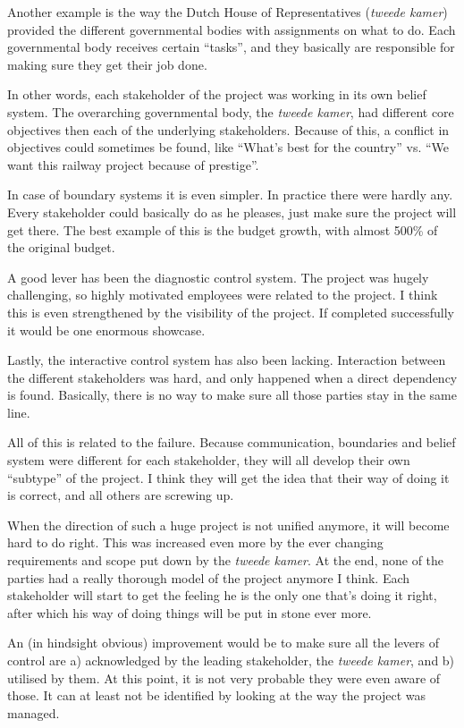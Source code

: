 \documentclass[]{uva-bachelor-thesis}
\begin{document}
Another example is the way the Dutch House of Representatives (\emph{tweede kamer}) provided the different governmental bodies with assignments on what to do. 
Each governmental body receives certain ``tasks'', and they basically are responsible for making sure they get their job done.

In other words, each stakeholder of the project was working in its own belief system.
The overarching governmental body, the \emph{tweede kamer}, had different core objectives then each of the underlying stakeholders. 
Because of this, a conflict in objectives could sometimes be found, like ``What's best for the country'' vs. ``We want this railway project because of prestige''.

In case of boundary systems it is even simpler. 
In practice there were hardly any. 
Every stakeholder could basically do as he pleases, just make sure the project will get there. 
The best example of this is the budget growth, with almost 500\% of the original budget.

A good lever has been the diagnostic control system. 
The project was hugely challenging, so highly motivated employees were related to the project. 
I think this is even strengthened by the visibility of the project. 
If completed successfully it would be one enormous showcase.

Lastly, the interactive control system has also been lacking. 
Interaction between the different stakeholders was hard, and only happened when a direct dependency is found. 
Basically, there is no way to make sure all those parties stay in the same line. 

All of this is related to the failure. 
Because communication, boundaries and belief system were different for each stakeholder, they will all develop their own ``subtype'' of the project. 
I think they will get the idea that their way of doing it is correct, and all others are screwing up. 

When the direction of such a huge project is not unified anymore, it will become hard to do right. 
This was increased even more by the ever changing requirements and scope put down by the \emph{tweede kamer}. 
At the end, none of the parties had a really thorough model of the project anymore I think.
Each stakeholder will start to get the feeling he is the only one that's doing it right, after which his way of doing things will be put in stone ever more.

An (in hindsight obvious) improvement would be to make sure all the levers of control are a) acknowledged by the leading stakeholder, the \emph{tweede kamer}, and b) utilised by them. 
At this point, it is not very probable they were even aware of those. 
It can at least not be identified by looking at the way the project was managed.
\end{document}
